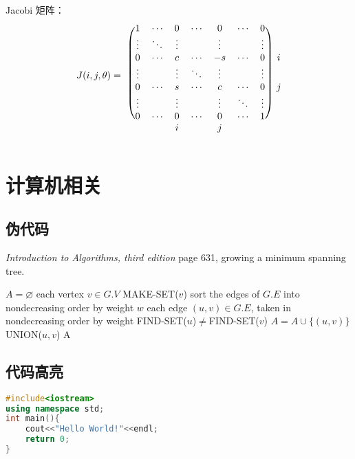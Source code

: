 \documentclass[a4paper,12pt]{article}
\begin{document}
Jacobi 矩阵：
\[
\begin{blockarray}{r@{}cccccccc}
\begin{block}{r(ccccccc)c}
                 & 1 & \cdots & 0 & \cdots & 0 & \cdots & 0 \\
                 & \vdots & \ddots & \vdots & & \vdots & & \vdots \\
                 & 0 & \cdots & c & \cdots & -s & \cdots & 0 & i \\
J(i,j,\theta)={} & \vdots & & \vdots & \ddots & \vdots & & \vdots \\
                 & 0 & \cdots & s & \cdots & c & \cdots & 0 & j \\
                 & \vdots & & \vdots & & \vdots & \ddots & \vdots \\
                 & 0 & \cdots & 0 & \cdots & 0 & \cdots & 1 \\
\end{block}
                 & & & i & & j & \\
\end{blockarray}
\]


\section{计算机相关}

\subsection{伪代码}

\textit{Introduction to Algorithms, third edition} page 631, growing a minimum spanning tree.

\begin{codebox}
\li $A=\varnothing$
\li \For each vertex $v\in G.V$
	\Do
\li MAKE-SET($v$)
	\End
\li sort the edges of $G.E$ into nondecreasing order by weight $w$
\li \For each edge $(u,v)\in G.E$, taken in nondecreasing order by weight
	\Do
\li \If FIND-SET($u$)$\neq$FIND-SET($v$)
	\Then
\li $A=A\cup\{(u,v)\}$
\li UNION($u,v$)
	\End
	\End
\li \Return A
\end{codebox}


\subsection{代码高亮}

\begin{lstlisting}[language=c++]
#include<iostream>
using namespace std;
int main(){
	cout<<"Hello World!"<<endl;
	return 0;
}
\end{lstlisting}
\end{document}
